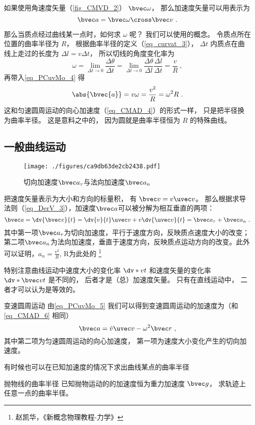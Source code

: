 如果使用角速度矢量（\autoref{fig_CMVD_2}） $\bvec \omega$， 那么加速度矢量可以用表示为
\begin{equation}
\bvec a = \bvec \omega \cross \bvec v~.
\end{equation}

那么当质点经过曲线某一点时，如何求 $\omega$ 呢？ 我们可以使用的概念。 令质点所在位置的曲率半径为 $R$， 根据曲率半径的定义（\autoref{eq_curvat_3}）， $\Delta t$ 内质点在曲线上走过的长度为 $\Delta l = v \Delta t$， 所以切线的角度变化率为
\begin{equation}
\omega = \lim_{\Delta t\to 0}\frac{\Delta \theta}{\Delta t} = \lim_{\Delta t\to 0}\frac{\Delta \theta}{\Delta l} \frac{\Delta l}{\Delta t} = \frac{v}{R}~,
\end{equation}
再带入\autoref{eq_PCuvMo_4} 得
\begin{equation}\label{eq_PCuvMo_3}
\abs{\bvec{a}} = v\omega = \frac{v^2}{R} = \omega^2 R~.
\end{equation}
这和匀速圆周运动的向心加速度（\autoref{eq_CMAD_4}）的形式一样， 只是把半径换为曲率半径。 这是意料之中的， 因为圆就是曲率半径恒为 $R$ 的特殊曲线。

\subsection{一般曲线运动}
\begin{figure}[ht]
\centering
\texttt{[image: ./figures/ca9db63de2cb2438.pdf]}
\caption{切向加速度$\bvec a_\tau$与法向加速度$\bvec a_n$} \label{fig_PCuvMo_2}
\end{figure}
把速度矢量表示为大小和方向的标量积， 有 $\bvec v = v\uvec v$。 那么根据求导法则（\autoref{eq_DerV_3}），加速度$\bvec a$可以被分解为相互垂直的两项：
\begin{equation}\label{eq_PCuvMo_5}
\bvec a = \dv{\bvec v}{t} = \dv{v}{t}\uvec v + v\dv{\uvec v}{t} = \bvec a_{\tau}+\bvec a_n~.
\end{equation}
其中第一项$\bvec a_{\tau}$为切向加速度，平行于速度方向，反映质点速度大小的改变；第二项$\bvec a_n$为法向加速度，垂直于速度方向，反映质点运动方向的改变。此外可以证明，$a_n=\frac{v^2}{R}$, R为此处的 \footnote{赵凯华，《新概念物理教程-力学》}

特别注意曲线运动中速度大小的变化率 $\dv*{v}{t}$ 和速度矢量的变化率 $\dv*{\bvec v}{t}$ 是不同的， 后者才是（总）加速度矢量。 只有在直线运动中， 二者才可以认为是等效的。

\begin{example}{变速圆周运动}\label{ex_PCuvMo_1}
由\autoref{eq_PCuvMo_5} 我们可以得到变速圆周运动的加速度为（和\autoref{eq_CMAD_6} 相同）
\begin{equation}
\bvec a = \dot v \uvec v - \omega ^2 \bvec r~,
\end{equation}
其中第二项为匀速圆周运动的向心加速度， 第一项为速度大小变化产生的切向加速度。
\end{example}

有时候也可以在已知加速度的情况下求出曲线某点的曲率半径
\begin{exercise}{抛物线的曲率半径}
已知抛物运动的的加速度恒为重力加速度 $\bvec g$， 求轨迹上任意一点的曲率半径。
\end{exercise}
